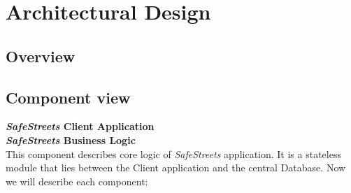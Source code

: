 \documentclass{article}
\begin{document}
\clearpage

\section{Architectural Design}
\subsection{Overview}

\subsection{Component view}

\textbf{\textit{SafeStreets} Client Application} \\


\textbf{\textit{SafeStreets} Business Logic} \\
This component describes core logic of \textit{SafeStreets} application. It is a stateless module 
that lies between the Client application and the central Database. Now we will describe each component:
\end{document}
